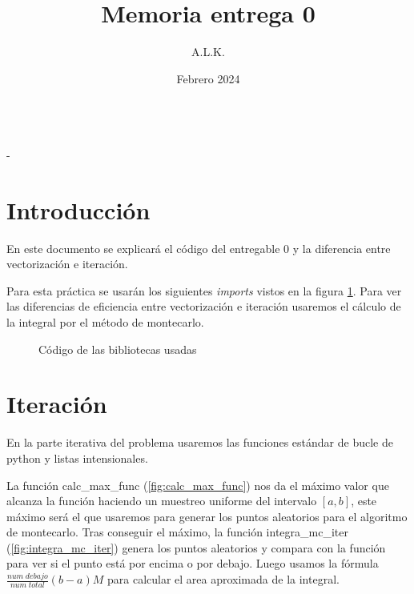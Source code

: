 \documentclass[6pt]{../../shared/AiTex}
\title{Memoria entrega 0}
\author{A.L.K.}
\date{Febrero 2024}
\begin{document}
\justify

\begin{center}

    {\huge \textbf{\underline{\subtitulo}}} \\
    { \lesson - \autor}

\end{center}


\section*{Introducción}

En este documento se explicará el código del entregable 0 y la diferencia entre vectorización e iteración.

Para esta práctica se usarán los siguientes \textit{imports} vistos en la figura \ref{fig:imports}. Para ver las diferencias de eficiencia entre vectorización e iteración usaremos el cálculo de la integral por el método de montecarlo.
\begin{figure}[H]
    \centering
    
    \caption{Código de las bibliotecas usadas}
    \label{fig:imports}
\end{figure}

\section{Iteración}

En la parte iterativa del problema usaremos las funciones estándar de bucle de python y listas intensionales.

La función \textcolor{codepurple}{calc\_max\_func} (\ref{fig:calc_max_func}) nos da el máximo valor que alcanza la función haciendo un muestreo uniforme del intervalo $[a,b]$, este máximo será el que usaremos para generar los puntos aleatorios para el algoritmo de montecarlo.
Tras conseguir el máximo, la función \textcolor{codepurple}{integra\_mc\_iter} (\ref{fig:integra_mc_iter}) genera los puntos aleatorios y compara con la función para ver si el punto está por encima o por debajo. Luego usamos la fórmula $\frac{num\;debajo}{num\;total}(b-a)M$ para calcular el area aproximada de la integral.
\end{document}
